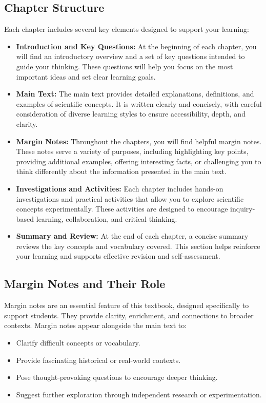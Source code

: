 \subsection{Chapter Structure}

Each chapter includes several key elements designed to support your learning:

\begin{itemize}
    \item \textbf{Introduction and Key Questions:} At the beginning of each chapter, you will find an introductory overview and a set of key questions intended to guide your thinking. These questions will help you focus on the most important ideas and set clear learning goals.
    \item \textbf{Main Text:} The main text provides detailed explanations, definitions, and examples of scientific concepts. It is written clearly and concisely, with careful consideration of diverse learning styles to ensure accessibility, depth, and clarity.
    \item \textbf{Margin Notes:} Throughout the chapters, you will find helpful margin notes. These notes serve a variety of purposes, including highlighting key points, providing additional examples, offering interesting facts, or challenging you to think differently about the information presented in the main text.
    \item \textbf{Investigations and Activities:} Each chapter includes hands-on investigations and practical activities that allow you to explore scientific concepts experimentally. These activities are designed to encourage inquiry-based learning, collaboration, and critical thinking.
    \item \textbf{Summary and Review:} At the end of each chapter, a concise summary reviews the key concepts and vocabulary covered. This section helps reinforce your learning and supports effective revision and self-assessment.
\end{itemize}

\subsection{Margin Notes and Their Role}

Margin notes are an essential feature of this textbook, designed specifically to support students. They provide clarity, enrichment, and connections to broader contexts. Margin notes appear alongside the main text to:

\begin{itemize}
    \item Clarify difficult concepts or vocabulary.
    \item Provide fascinating historical or real-world contexts.
    \item Pose thought-provoking questions to encourage deeper thinking.
    \item Suggest further exploration through independent research or experimentation.
\end{itemize}

